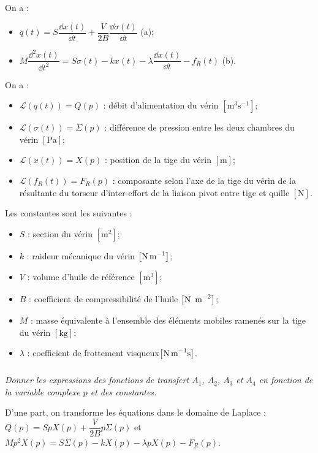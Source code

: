 \begin{multicols}{2}
\begin{center}
\end{center}
\normalsize

On a : 
\begin{itemize}
\item $q(t)=S\dfrac{\dd x(t)}{ \dd t}+\dfrac{V}{2B}\dfrac{\dd \sigma(t)}{\dd t}$ (a);
\item $M\dfrac{\dd^2 x(t)}{\dd t^2} = S \sigma(t) - kx(t)-\lambda \dfrac{\dd x(t)}{\dd t} - f_R(t)$ (b).
\end{itemize}

On a :
\begin{itemize}
\item $\mathcal{L}\left(q(t)\right)=Q(p)$ : débit d’alimentation du vérin $\left[\text{m}^3\text{s}^{-1}\right]$;
\item $\mathcal{L}\left(\sigma(t)\right)=\Sigma(p)$ : différence de pression entre les deux chambres du vérin $\left[\text{Pa}\right]$;
\item $\mathcal{L}\left(x(t)\right)=X(p)$ : position de la tige du vérin $\left[\text{m}\right]$;
\item $\mathcal{L}\left(f_R(t)\right)=F_R(p)$ : composante selon l'axe de la tige du vérin de la résultante du torseur d'inter-effort de la liaison pivot entre tige et quille $\left[\text{N}\right]$.
\end{itemize}
Les constantes sont les suivantes :
\begin{itemize}
\item $S$ : section du vérin $\left[\text{m}^2\right]$;
\item $k$ : raideur mécanique du vérin $\left[\text{N\,m}^{-1}\right]$;
\item $V$ : volume d'huile de référence $\left[\text{m}^{3}\right]$;
\item $B$ : coefficient de compressibilité de l'huile $\left[\text{N\, m}^{-2}\right]$;
\item $M$ : masse équivalente à l'ensemble des éléments mobiles ramenés sur la tige du vérin $\left[\text{kg}\right]$;
\item $\lambda$ : coefficient de frottement visqueux$\left[\text{N\,m}^{-1}\text{s}\right]$.
\end{itemize} 

\fi
\subparagraph{}
\textit{Donner les expressions des fonctions de transfert $A_1$, $A_2$, $A_3$ et $A_4$ en fonction de la variable
complexe $p$ et des constantes.}
\ifprof
\begin{corrige}
D'une part, on transforme les équations dans le domaine de Laplace : 
$Q(p)=S p X(p)+\dfrac{V}{2B} p \Sigma(p)$ et
$Mp^2 X(p) = S \Sigma(p) - kX(p)-\lambda p X(p) - F_R(p)$.


\end{corrige}
\end{multicols}
